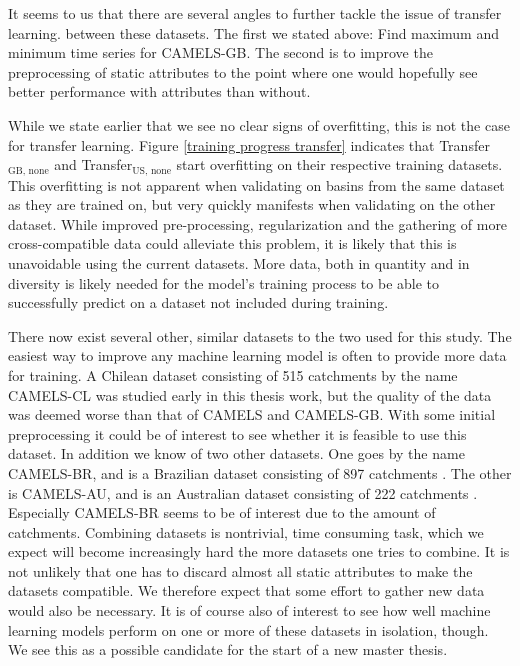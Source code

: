 It seems to us that there are several angles to further tackle the issue of transfer 
learning. between these datasets. The first we stated above: Find maximum and minimum time series for 
CAMELS-GB. The second is to improve the preprocessing of static attributes to 
the point where one would hopefully see better performance with attributes than 
without. 

While we state earlier that we see no clear signs of overfitting, this is not 
the case for transfer learning. Figure 
\ref{training progress transfer} indicates that Transfer$_\text{GB, none}$ 
and Transfer$_\text{US, none}$ start overfitting on their respective training 
datasets. This overfitting is not apparent when validating on basins from the 
same dataset as they are trained on, but very quickly manifests when validating 
on the other dataset. While improved pre-processing, regularization and the gathering 
of more  cross-compatible data could alleviate this problem, it is likely that this is 
unavoidable using the current datasets. More data, both in quantity and in 
diversity is likely needed for the model's training process to be able to 
successfully predict on a dataset not included during training.

There now exist several other, similar datasets to the two used for this study. 
The easiest way to improve 
any machine learning model is often to provide more data for training. A Chilean 
dataset consisting of 515 catchments by the name CAMELS-CL \citep{CAMELS_CL} 
was studied early in this thesis work, but the quality 
of the data was deemed worse than that of CAMELS and CAMELS-GB. With some initial 
preprocessing it could be of interest to see whether it is feasible to use this 
dataset.
In addition we know of two other datasets. One goes by the name CAMELS-BR, and is 
a Brazilian dataset consisting of 897 catchments \citep{CAMELS_BR}.
The other is CAMELS-AU, and is an Australian dataset consisting of 222 catchments
 \citep{CAMELS_AU}. Especially CAMELS-BR seems to be of interest due to the 
amount of catchments. Combining datasets is nontrivial, time consuming task, which 
we expect will become increasingly hard the more datasets one tries to combine. 
It is not unlikely that one has to discard almost all static attributes to make 
the datasets compatible. We therefore expect that some effort to gather new data 
would also be necessary. It is of course also of interest to see how well machine 
learning models perform on one or more of these datasets in isolation, though. 
We see this as a possible candidate for the start of a new master thesis.
